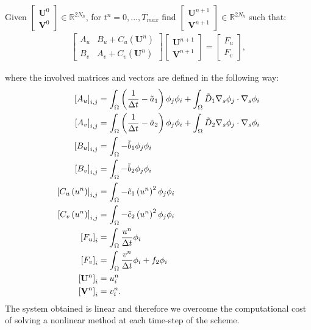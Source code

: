 Given $\begin{bmatrix} \mathbf{U}^{0} \\ \mathbf{V}^{0} \end{bmatrix} \in \mathds{R}^{2 N_h}$, for $t^n = 0,...,T_{max}$ find $\begin{bmatrix} \mathbf{U}^{n+1} \\ \mathbf{V}^{n+1} \end{bmatrix} \in \mathds{R}^{2 N_h}$ such that:
\begin{equation}\label{eq:LinSys}
\begin{aligned}
   \begin{bmatrix}
  A_u & B_u + C_u\left(  \mathbf{U}^n\right) \\
  B_v & A_v + C_v\left(  \mathbf{U}^n\right)
  \end{bmatrix} \begin{bmatrix}
  \mathbf{U}^{n+1} \\ \mathbf{V}^{n+1} \end{bmatrix} = \begin{bmatrix} F_u \\ F_v
  \end{bmatrix},
\end{aligned}\end{equation}

where the involved matrices and vectors are defined in the following way:
\begin{equation}\begin{aligned}
    \left[ A_u\right]_{i,j} & = \int_{\Omega} \left( \frac{1}{\Delta t} - \Tilde{a}_1 \right) \phi_j \phi_i + \int_{\Omega} \Tilde{D}_1 \nabla_s \phi_j \cdot \nabla_s \phi_i \\
    \left[ A_v\right]_{i,j} & = \int_{\Omega} \left( \frac{1}{\Delta t} - \Tilde{a}_2 \right) \phi_j \phi_i + \int_{\Omega} \Tilde{D}_2 \nabla_s \phi_j \cdot \nabla_s \phi_i \\
    \left[B_u\right]_{i,j} & = \int_{\Omega} - \Tilde{b}_1 \phi_j \phi_i \\
    \left[B_v\right]_{i,j} & = \int_{\Omega} - \Tilde{b}_2 \phi_j \phi_i \\
    \left[ C_u\left(u^n\right)\right]_{i,j} & = \int_\Omega - \Tilde{c}_1 \left(u^n\right)^2 \phi_j \phi_i \\
    \left[ C_v\left(u^n\right)\right]_{i,j} & = \int_\Omega - \Tilde{c}_2 \left(u^n\right)^2 \phi_j \phi_i \\
    \left[ F_u\right]_i & = \int_{\Omega} \frac{u^n}{\Delta t} \phi_i \\
    \left[ F_v\right]_i & = \int_{\Omega} \frac{v^n}{\Delta t} \phi_i + f_2 \phi_i \\
    \left[\mathbf{U}^{n}\right]_i & = u^n_i \\
    \left[\mathbf{V}^{n}\right]_i & = v^n_i.
\end{aligned}\end{equation}
The system obtained is linear and therefore we overcome the computational cost of solving a nonlinear method at each time-step of the scheme.

